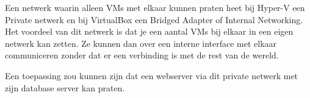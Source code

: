 Een netwerk waarin alleen VMs met elkaar kunnen praten heet bij Hyper-V een Private netwerk en bij VirtualBox een Bridged Adapter of Internal Networking. Het voordeel van dit netwerk is dat je een aantal VMs bij elkaar in een eigen netwerk kan zetten. Ze kunnen dan over een interne interface met elkaar communiceren zonder dat er een verbinding is met de rest van de wereld.

Een toepassing zou kunnen zijn dat een webserver via dit private netwerk met zijn database server kan praten.
